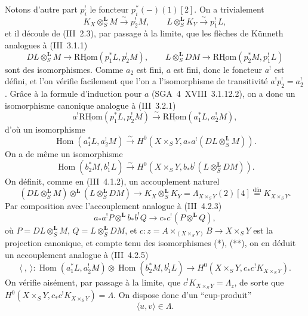 \documentclass[11pt]{article}
\DeclareMathOperator{\Hom}{Hom}
\newcommand{\R}{\mathrm{R}}\newcommand{\RHomCore}{\mathrm{RHom}}
\providecommand{\RHom}{\RHomCore}
\providecommand{\uRHom}{\underline{\RHom}}
\providecommand{\LL}{\mathbf L}
\providecommand{\RHom}{\RHomCore}
\providecommand{\Hom}{\operatorname{Hom}}
\providecommand{\RHom}{\R\mathcal{H}om}
\providecommand{\R}{\mathrm R}
\providecommand{\RHom}{\RHomCore}
\providecommand{\Hom}{\operatorname{Hom}}
\begin{document}
Notons d'autre part $p_i^!$ le foncteur $p_i^*(-)(1)[2]$. On a trivialement
\[
K_X\otimes_S^{\LL}M\xrightarrow{\sim}p_2^!M,
\qquad
L\otimes_S^{\LL}K_Y\xrightarrow{\sim}p_1^!L,
\]
et il découle de (III~2.3), par passage à la limite, que les flèches de Künneth analogues à (III~3.1.1)
\[
DL\otimes_S^{\LL}M\longrightarrow \uRHom(p_1^*L,p_2^!M),
\qquad
L\otimes_S^{\LL}DM\longrightarrow \uRHom(p_2^*M,p_1^!L)
\]
sont des isomorphismes. Comme $a_2$ est fini, $a$ est fini, donc le foncteur $a^!$ est défini, et l'on vérifie facilement que l'on a l'isomorphisme de transitivité $a^!p_2^!=a_2^!$. Grâce à la formule d'induction pour $a$ (SGA~4~XVIII~3.1.12.2), on a donc un isomorphisme canonique analogue à (III~3.2.1)
\[
a^!\uRHom(p_1^*L,p_2^!M)\xrightarrow{\sim}\uRHom(a_1^*L,a_2^!M),
\]
d'où un isomorphisme
\begin{equation}\tag{*}
\Hom(a_1^*L,a_2^!M)\xrightarrow{\sim}H^0(X\times_S Y,a_*a^!(DL\otimes_S^{\LL}M)).
\end{equation}
On a de même un isomorphisme
\begin{equation}\tag{**}
\Hom(b_2^*M,b_1^!L)\xrightarrow{\sim}H^0(X\times_S Y,b_*b^!(L\otimes_S^{\LL}DM)).
\end{equation}
On définit, comme en (III~4.1.2), un accouplement naturel
\[
(DL\otimes_S^{\LL}M)\otimes^{\LL}(L\otimes_S^{\LL}DM)
\longrightarrow K_X\otimes_S^{\LL}K_Y=\Lambda_{X\times_S Y}(2)[4]\stackrel{\mathrm{dfn}}{=}K_{X\times_S Y}.
\]
Par composition avec l'accouplement analogue à (III~4.2.3)
\[
a_*a^!P\otimes^{\LL} b_*b^!Q\longrightarrow c_*c^!(P\otimes^{\LL}Q),
\]
où $P=DL\otimes_S^{\LL}M$, $Q=L\otimes_S^{\LL}DM$, et $c:z=A\times_{(X\times_S Y)}B\to X\times_S Y$ est la projection canonique, et compte tenu des isomorphismes (*), (**), on en déduit un accouplement analogue à (III~4.2.5)
\[
\langle\ ,\ \rangle:\Hom(a_1^*L,a_2^!M)\otimes\Hom(b_2^*M,b_1^!L)
\longrightarrow H^0(X\times_S Y,c_*c^!K_{X\times_S Y}).
\]
On vérifie aisément, par passage à la limite, que $c^!K_{X\times_S Y}=\Lambda_z$, de sorte que $H^0(X\times_S Y,c_*c^!K_{X\times_S Y})=\Lambda$. On dispose donc d'un ``cup-produit''
\begin{equation}\tag{1.1.2}
\langle u,v\rangle\in\Lambda.
\end{equation}
\end{document}
